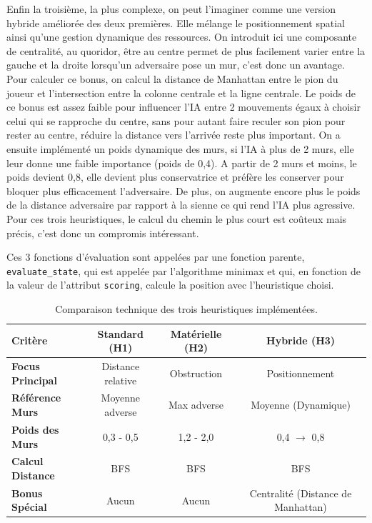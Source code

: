 \documentclass[a4paper]{article}
\begin{document}
Enfin la troisième, la plus complexe, on peut l’imaginer comme une version hybride améliorée des deux premières. 
Elle mélange le positionnement spatial ainsi qu’une gestion dynamique des ressources. On introduit ici une composante de centralité, 
au quoridor, être au centre permet de plus facilement varier entre la gauche et la droite lorsqu’un adversaire pose un mur, 
c’est donc un avantage. Pour calculer ce bonus, on calcul la distance de Manhattan entre le pion du joueur et l'intersection entre la colonne 
centrale et la ligne centrale. Le poids de ce bonus est assez faible pour influencer l’IA entre 2 mouvements égaux à choisir celui qui se 
rapproche du centre, sans pour autant faire reculer son pion pour rester au centre, réduire la distance vers l'arrivée reste plus important. 
On a ensuite implémenté un poids dynamique des murs, si l’IA à plus de 2 murs, elle leur donne une faible importance (poids de 0,4). 
A partir de 2 murs et moins, le poids devient 0,8, elle devient plus conservatrice et préfère les conserver pour bloquer plus efficacement 
l’adversaire. De plus, on augmente encore plus le poids de la distance adversaire par rapport à la sienne ce qui rend l’IA plus agressive.
Pour ces trois heuristiques, le calcul du chemin le plus court est coûteux mais précis, c’est donc un compromis intéressant. 

\bigskip

Ces 3 fonctions d’évaluation sont appelées par une fonction parente, \texttt{evaluate\_state}, qui est appelée par l'algorithme minimax et qui, 
en fonction de la valeur de l’attribut \texttt{scoring}, calcule la position avec l’heuristique choisi.

\begin{table}[H]
\centering
\begin{tabular}{|l|c|c|c|}
\hline
\textbf{Critère} & \textbf{Standard (H1)} & \textbf{Matérielle (H2)} & \textbf{Hybride (H3)} \\ \hline
\textbf{Focus Principal} & Distance relative & Obstruction & Positionnement \\ \hline
\textbf{Référence Murs} & Moyenne adverse & Max adverse & Moyenne (Dynamique) \\ \hline
\textbf{Poids des Murs} & 0,3 - 0,5 & 1,2 - 2,0 & 0,4 $\rightarrow$ 0,8 \\ \hline
\textbf{Calcul Distance} & BFS & BFS & BFS \\ \hline
\textbf{Bonus Spécial} & Aucun & Aucun & Centralité (Distance de Manhattan) \\ \hline
\end{tabular}
\caption{Comparaison technique des trois heuristiques implémentées.}
\end{table}
\end{document}
